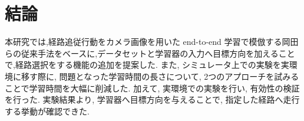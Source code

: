 \chapter{結論}
\label{chap:end}
本研究では,経路追従行動をカメラ画像を用いた end-to-end 学習で模倣する岡田らの従来手法をベースに,データセットと学習器の入力へ目標方向を加えることで,経路選択をする機能の追加を提案した. また, シミュレータ上での実験を実環境に移す際に, 問題となった学習時間の長さについて, 2つのアプローチを試みることで学習時間を大幅に削減した. 加えて, 実環境での実験を行い, 有効性の検証を行った. 実験結果より, 学習器へ目標方向を与えることで, 指定した経路へ走行する挙動が確認できた.

%
%
% 
%
